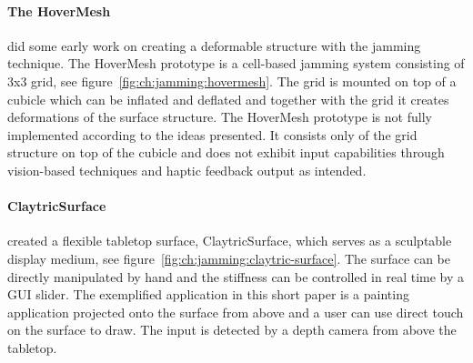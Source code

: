 \paragraph{The HoverMesh}
\label{ch:jamming:related-work:hci:hovermesh}
\citet{mazzone2004hovermesh} did some early work on creating a deformable structure with the jamming technique. 
The HoverMesh prototype is a cell-based jamming system consisting of 3x3 grid, see figure~\ref{fig:ch:jamming:hovermesh}.
The grid is mounted on top of a cubicle which can be inflated and deflated and together with the grid it creates deformations of the surface structure.
The HoverMesh prototype is not fully implemented according to the ideas presented.
It consists only of the grid structure on top of the cubicle and does not exhibit input capabilities through vision-based techniques and haptic feedback output as intended. 

\paragraph{ClaytricSurface}
\label{ch:jamming:related-work:hci:claytric}
\citet{matoba2012claytricsurface} created a flexible tabletop surface, ClaytricSurface, which serves as a sculptable display medium, see figure~\ref{fig:ch:jamming:claytric-surface}. 
The surface can be directly manipulated by hand and the stiffness can be controlled in real time by a GUI slider.
The exemplified application in this short paper is a painting application projected onto the surface from above and a user can use direct touch on the surface to draw. 
The input is detected by a depth camera from above the tabletop.

